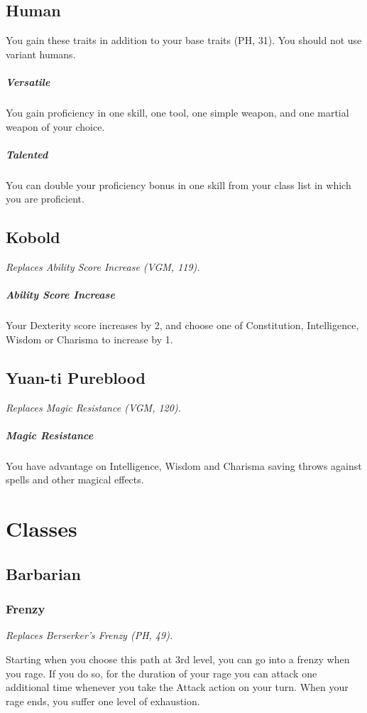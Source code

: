 \documentclass[letterpaper,twocolumn,openany,nodeprecatedcode]{dndbook}
\begin{document}
\label{balance-race-human}
\subsection{Human}

You gain these traits in addition to your base traits (PH, 31). You should not use variant humans.

\subparagraph{Versatile} You gain proficiency in one skill, one tool, one simple weapon, and one martial weapon of your choice.
\subparagraph{Talented} You can double your proficiency bonus in one skill from your class list in which you are proficient.

\label{balance-race-kobold}
\subsection{Kobold}
\textit{Replaces Ability Score Increase (VGM, 119).}

\subparagraph{Ability Score Increase} Your Dexterity score increases by 2, and choose one of Constitution, Intelligence, Wisdom or Charisma to increase by 1.

\label{balance-race-yuanti}
\subsection{Yuan-ti Pureblood}
\textit{Replaces Magic Resistance (VGM, 120).}

\subparagraph{Magic Resistance} You have advantage on Intelligence, Wisdom and Charisma saving throws against spells and other magical effects.

\label{balance-classes}
\section{Classes}

\subsection{Barbarian}
\subsubsection{Frenzy}
\textit{Replaces Berserker's Frenzy (PH, 49).}

Starting when you choose this path at 3rd level, you can go into a frenzy when you rage. If you do so, for the duration of your rage you can attack one additional time whenever you take the Attack action on your turn. When your rage ends, you suffer one level of exhaustion.
\end{document}

